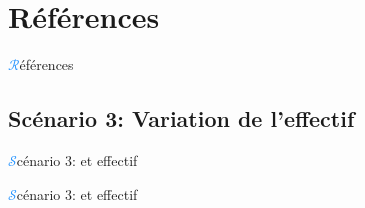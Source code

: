 \section{Références}
\begin{frame}[allowframebreaks]{{\huge\textcolor{dodgerblue}{$\mathcal{R}$}}éférences}
    
    
\end{frame}


\subsection{Scénario 3: Variation de l'effectif}
\begin{frame}{{\huge\textcolor{dodgerblue}{$\mathcal{S}$}}cénario 3:  et effectif}
\begin{center}
\end{center}
\end{frame}
\begin{frame}{{\huge\textcolor{dodgerblue}{$\mathcal{S}$}}cénario 3:  et effectif}
\begin{center}
\end{center}
\end{frame}

